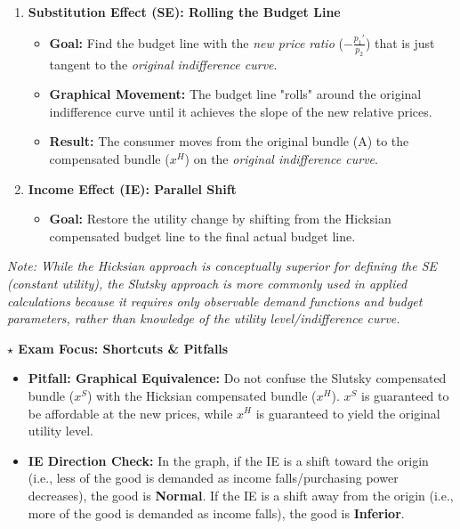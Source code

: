 \documentclass{article}
\begin{document}
\begin{enumerate}
    \item \textbf{Substitution Effect (SE): Rolling the Budget Line}
    \begin{itemize}
        \item \textbf{Goal:} Find the budget line with the \textit{new price ratio} ($-\frac{p_1'}{p_2}$) that is just tangent to the \textit{original indifference curve}.
        \item \textbf{Graphical Movement:} The budget line "rolls" around the original indifference curve until it achieves the slope of the new relative prices.
        \item \textbf{Result:} The consumer moves from the original bundle (A) to the compensated bundle ($x^H$) on the \textit{original indifference curve}.
    \end{itemize}
    \item \textbf{Income Effect (IE): Parallel Shift}
    \begin{itemize}
        \item \textbf{Goal:} Restore the utility change by shifting from the Hicksian compensated budget line to the final actual budget line.
    \end{itemize}
\end{enumerate}

\textit{Note: While the Hicksian approach is conceptually superior for defining the SE (constant utility), the Slutsky approach is more commonly used in applied calculations because it requires only observable demand functions and budget parameters, rather than knowledge of the utility level/indifference curve.}

\vspace{1em}
\textbf{$\star$ Exam Focus: Shortcuts \& Pitfalls}

\begin{itemize}
    \item \textbf{Pitfall: Graphical Equivalence:} Do not confuse the Slutsky compensated bundle ($x^S$) with the Hicksian compensated bundle ($x^H$). $x^S$ is guaranteed to be affordable at the new prices, while $x^H$ is guaranteed to yield the original utility level.
    \item \textbf{IE Direction Check:} In the graph, if the IE is a shift toward the origin (i.e., less of the good is demanded as income falls/purchasing power decreases), the good is \textbf{Normal}. If the IE is a shift away from the origin (i.e., more of the good is demanded as income falls), the good is \textbf{Inferior}.
\end{itemize}
\end{document}
